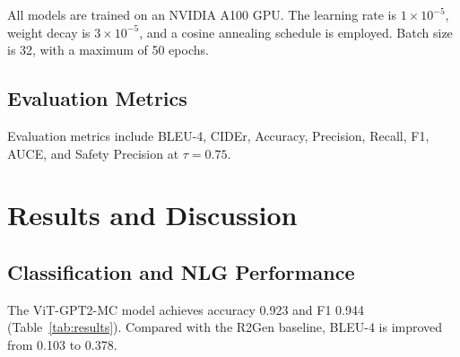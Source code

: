 \documentclass{jcst}
\begin{document}
All models are trained on an NVIDIA A100 GPU. The learning rate is $1 \times 10^{-5}$, 
weight decay is $3 \times 10^{-5}$, and a cosine annealing schedule is employed. 
Batch size is 32, with a maximum of 50 epochs.

\subsection{Evaluation Metrics}

Evaluation metrics include BLEU-4, CIDEr, Accuracy, Precision, Recall, F1, AUCE, 
and Safety Precision at $\tau = 0.75$.

\section{Results and Discussion}

\subsection{Classification and NLG Performance}

The ViT-GPT2-MC model achieves accuracy 0.923 and F1 0.944 (Table~\ref{tab:results}). 
Compared with the R2Gen baseline, BLEU-4 is improved from 0.103 to 0.378.

\begin{table}[ht]
\caption{\label{tab:results}Performance results across evaluation metrics.}
\centering
\small
{}
\end{table}
\end{document}
